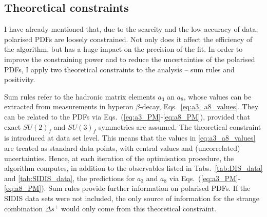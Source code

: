 \subsection{Theoretical constraints}
I have already mentioned that, due to the scarcity and the low accuracy of data, polarised PDFs are loosely constrained. Not only does it affect the efficiency of the algorithm, but has a huge impact on the precision of the fit. In order to improve the constraining power and to reduce the uncertainties of the polarised PDFs, I apply two theoretical constraints to the analysis -- sum rules and positivity.%

Sum rules refer to the hadronic matrix elements $a_3$ an $a_8$, whose values can be extracted from measurements in hyperon $\beta$-decay, Eqs.~\eqref{eq:a3_a8_values}. They can be related to the PDFs via Eqs.~(\ref{eq:a3_PM}-\ref{eq:a8_PM}), provided that exact $SU(2)_f$ and $SU(3)_f$ symmetries are assumed. The theoretical constraint is introduced at data set level. This means that the values in \eqref{eq:a3_a8_values} are treated as standard data points, with central values and (uncorrelated) uncertainties. Hence, at each iteration of the optimisation procedure, the algorithm computes, in addition to the observables listed in Tabs.~\ref{tab:DIS_data} and \ref{tab:SIDIS_data}, the predictions for $a_3$ and $a_8$ via Eqs.~(\ref{eq:a3_PM}-\ref{eq:a8_PM}). Sum rules provide further information on polarised PDFs. If the SIDIS data sets were not included, the only source of information for the strange combination $\Delta s^+$ would only come from this theoretical constraint.%

